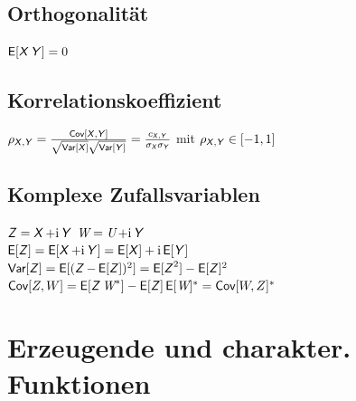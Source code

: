 \documentclass[german,color,6pt]{latex4ei/latex4ei_sheet}
\DeclareMathOperator{\W}{\textit{W}}				%
\DeclareMathOperator{\U}{\textit{U}}				%
\begin{document}
\begin{sectionbox}
	\subsection{Orthogonalität}
	
	\begin{emphbox}
		$\E[\X\Y] = 0$
	\end{emphbox}
	
\end{sectionbox}

\begin{sectionbox}
	\subsection{Korrelationskoeffizient}
	$\rho_{\X,\Y} = \frac{\Cov[\X,\Y]}{\sqrt{\Var[\X]} \sqrt{\Var[\Y]}} = \frac{c_{\X,\Y}}{\sigma_{\X} \sigma_{\Y}}$ mit $\rho_{\X, \Y} \in [-1,1]$
\end{sectionbox}


\begin{sectionbox}
	\subsection{Komplexe Zufallsvariablen}
	$\cx{\Z} = \X + \i \Y$ \qquad $\cx{\W} = \U + \i \Y$\\
	$\E[\Z] = \E[\X + \i \Y] = \E[\X] + \i \E[\Y]$\\
	$\Var[\Z] = \E [(\Z - \E[\Z])^2] = \E[\Z^2] - \E[\Z]^2$\\
	$\Cov[Z,W] = \E[\Z\W^*] - \E[\Z]\E[\W]^* = \Cov[W,Z]^*$
\end{sectionbox}


\section{Erzeugende und charakter. Funktionen}
\end{document}
